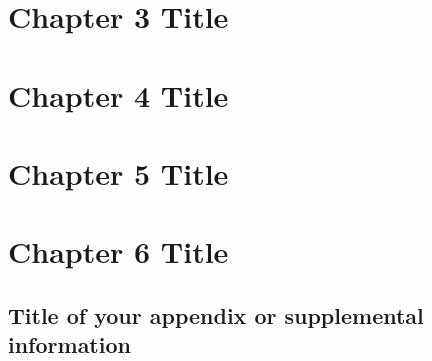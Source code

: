 \documentclass[12pt]{report}
\begin{document}
\begin{justify}
\chapter{Chapter 3 Title}


\chapter{Chapter 4 Title}


\chapter{Chapter 5 Title}


\chapter{Chapter 6 Title}


\begin{spacing}{1.0}
    \printbibliography
\end{spacing}

\begin{appendices}
    \chapter{Title of your appendix or supplemental information}
        \label{appendix:short_name_for_ref_command}
        
%       
%       
\end{appendices}

\end{justify}
\end{document}
